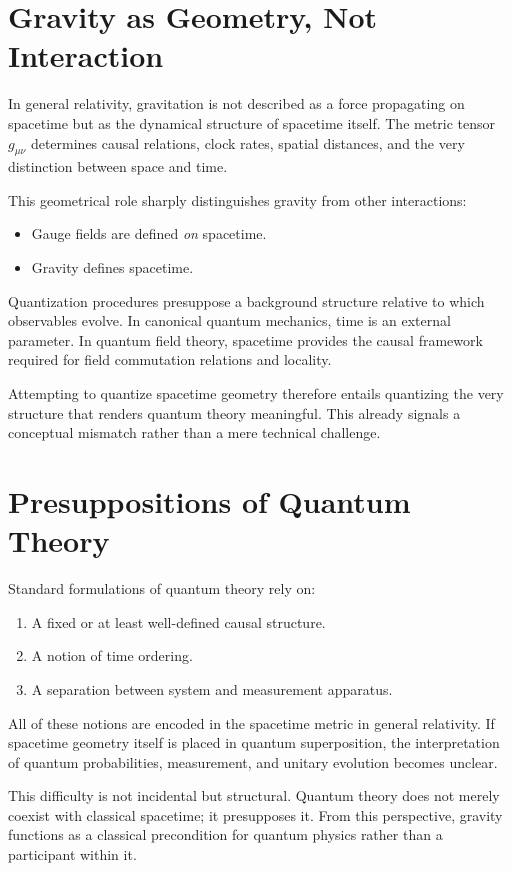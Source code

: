 \documentclass[12pt]{article}
\begin{document}
\section{Gravity as Geometry, Not Interaction}

In general relativity, gravitation is not described as a force propagating on spacetime but as the dynamical structure of spacetime itself. The metric tensor $g_{\mu\nu}$ determines causal relations, clock rates, spatial distances, and the very distinction between space and time.

This geometrical role sharply distinguishes gravity from other interactions:
\begin{itemize}
    \item Gauge fields are defined \emph{on} spacetime.
    \item Gravity defines spacetime.
\end{itemize}

Quantization procedures presuppose a background structure relative to which
observables evolve. In canonical quantum mechanics, time is an external
parameter. In quantum field theory, spacetime provides the causal framework
required for field commutation relations and locality.

Attempting to quantize spacetime geometry therefore entails quantizing the very
structure that renders quantum theory meaningful. This already signals a
conceptual mismatch rather than a mere technical challenge.

\section{Presuppositions of Quantum Theory}

Standard formulations of quantum theory rely on:
\begin{enumerate}
    \item A fixed or at least well-defined causal structure.
    \item A notion of time ordering.
    \item A separation between system and measurement apparatus.
\end{enumerate}

All of these notions are encoded in the spacetime metric in general relativity.
If spacetime geometry itself is placed in quantum superposition, the
interpretation of quantum probabilities, measurement, and unitary evolution
becomes unclear.

This difficulty is not incidental but structural. Quantum theory does not
merely coexist with classical spacetime; it presupposes it. From this
perspective, gravity functions as a classical precondition for quantum physics
rather than a participant within it.
\end{document}
